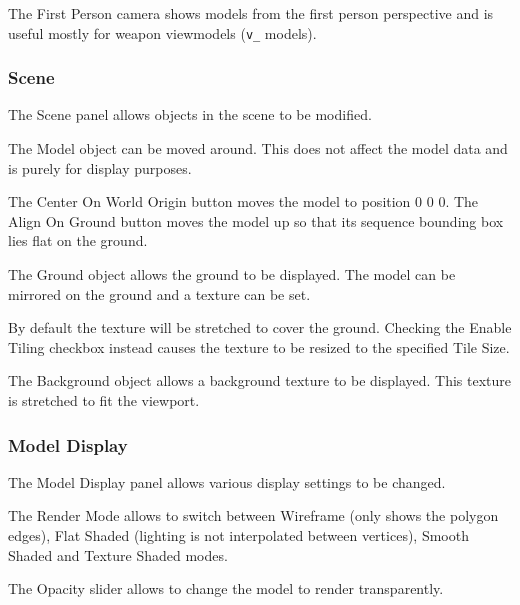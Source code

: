 \documentclass[10pt, a4paper, titlepage, oneside]{article}
\newcommand{\code}[1]{\mbox{\texttt{#1}}}
\begin{document}
\vspace{\baselineskip}
The First Person camera shows models from the first person perspective and is useful mostly for weapon viewmodels (\code{v\_} models).

\subsubsection{Scene}

The Scene panel allows objects in the scene to be modified.

\vspace{\baselineskip}
The Model object can be moved around. This does not affect the model data and is purely for display purposes.

\vspace{\baselineskip}
The Center On World Origin button moves the model to position 0 0 0.
The Align On Ground button moves the model up so that its sequence bounding box lies flat on the ground.

\vspace{\baselineskip}
The Ground object allows the ground to be displayed. The model can be mirrored on the ground and a texture can be set.

\vspace{\baselineskip}
By default the texture will be stretched to cover the ground. Checking the Enable Tiling checkbox instead causes the texture to be resized to the specified Tile Size.

\vspace{\baselineskip}
The Background object allows a background texture to be displayed. This texture is stretched to fit the viewport.

\newpage

\subsubsection{Model Display}

The Model Display panel allows various display settings to be changed.

\vspace{\baselineskip}
The Render Mode allows to switch between Wireframe (only shows the polygon edges), Flat Shaded (lighting is not interpolated between vertices), Smooth Shaded and Texture Shaded modes.

\vspace{\baselineskip}
The Opacity slider allows to change the model to render transparently.
\end{document}
